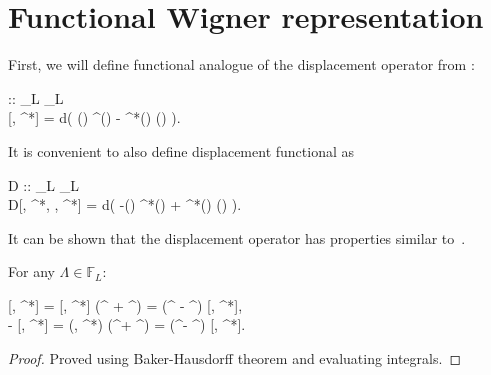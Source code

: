 \section{Functional Wigner representation}

First, we will define functional analogue of the displacement operator from :

\begin{definition}
	\begin{eqn*}
		 :: _L \rightarrow	{}_L \\
		[\Lambda, \Lambda^*] = \exp \int d\xvec \left(
			\Lambda(\xvec) \Psiop^\dagger(\xvec) - \Lambda^*(\xvec) \Psiop(\xvec)
		\right).
	\end{eqn*}
	It is convenient to also define displacement functional as
	\begin{eqn*}
		D :: _L \rightarrow {}_L \rightarrow \mathbb{C} \\
		D[\Lambda, \Lambda^*, \Psi, \Psi^*] = \exp \int d\xvec \left(
			-\Lambda(\xvec) \Psi^*(\xvec) + \Lambda^*(\xvec) \Psi(\xvec)
		\right).
	\end{eqn*}
\end{definition}

It can be shown that the displacement operator has properties similar to~.

\begin{lemma}
\label{lmm:func-wigner:displacement-derivatives}
	For any $\Lambda \in \mathbb{F}_L$:
	\begin{eqn*}
		\frac{\delta}{\delta \Lambda^\prime} [\Lambda, \Lambda^*]
		= [\Lambda, \Lambda^*] (\Psiop^{\prime\dagger} +  \Lambda^{\prime*})
		= (\Psiop^{\prime\dagger} -  \Lambda^{\prime*}) [\Lambda, \Lambda^*], \\
		-\frac{\delta}{\delta \Lambda^{\prime*}} [\Lambda, \Lambda^*]
		= (\Lambda, \Lambda^*) (\Psiop^\prime +  \Lambda^\prime)
		= (\Psiop^\prime -  \Lambda^\prime) [\Lambda, \Lambda^*].
	\end{eqn*}
\end{lemma}
\begin{proof}
Proved using Baker-Hausdorff theorem and evaluating integrals.
\end{proof}

